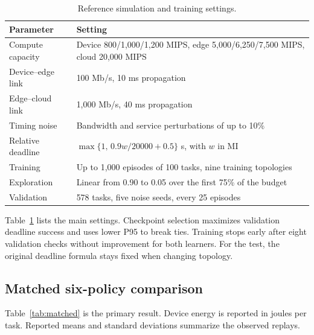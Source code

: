 \begin{table}[t]
\centering
\caption{Reference simulation and training settings.}
\label{tab:settings}
\small
\begin{tabular}{@{}p{}p{}@{}}
\toprule
Parameter & Setting \\
\midrule
Compute capacity & Device 800/1,000/1,200 MIPS, edge
5,000/6,250/7,500 MIPS, cloud 20,000 MIPS \\
Device--edge link & 100 Mb/s, 10 ms propagation \\
Edge--cloud link & 1,000 Mb/s, 40 ms propagation \\
Timing noise & Bandwidth and service perturbations of up to 10\% \\
Relative deadline & $\max\{1,\,0.9w/20000+0.5\}$ s, with $w$ in MI \\
Training & Up to 1,000 episodes of 100 tasks, nine training topologies \\
Exploration & Linear from 0.90 to 0.05 over the first 75\% of the budget \\
Validation & 578 tasks, five noise seeds, every 25 episodes \\
\bottomrule
\end{tabular}
\end{table}

Table~\ref{tab:settings} lists the main settings. Checkpoint selection
maximizes validation deadline success and uses lower P95 to break ties.
Training stops early after eight validation checks without improvement
for both learners. For the test, the original deadline
formula stays fixed when changing topology.

\subsection{Matched six-policy comparison}
Table~\ref{tab:matched} is the primary result. Device energy is reported in
joules per task. Reported means and standard deviations summarize the
observed replays.

\begin{table}[t]
\centering
\caption{Matched reference-topology comparison. Means $\pm$ SD; P95 is per
replay before aggregation.}
\label{tab:matched}
\scriptsize
{}
\end{table}

